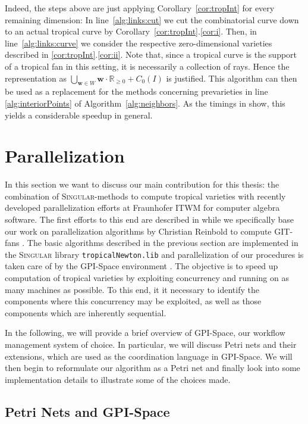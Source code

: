 \documentclass[
  paper=a4,
  titlepage,
  bibliography=totoc,
  pagesize=pdftex
]{scrartcl}
\numberwithin{figure}{section}
\numberwithin{equation}{section}
\numberwithin{table}{section}
\newcommand*\setR{\mathds{R}}
\let\vec\mathbf
\theoremstyle{definition}
\numberwithin{definition}{section}
\begin{document}
Indeed, the steps above are just applying Corollary~\ref{cor:tropInt} for every remaining
dimension: In line~\ref{alg:links:cut} we cut the combinatorial curve down to an actual
tropical curve by Corollary~\ref{cor:tropInt}.\ref{cor:i}. Then, in
line~\ref{alg:links:curve} we consider the respective zero-dimensional varieties described
in \ref{cor:tropInt}.\ref{cor:ii}. Note that, since a tropical curve is the support of a
tropical fan in this setting, it is necessarily a collection of rays. Hence the
representation as $\bigcup_{\vec w \in W} \vec w\cdot \setR_{\geq0} + C_0(I)$ is
justified. This algorithm can then be used as a replacement for the methods concerning
prevarieties in line \ref{alg:interiorPoints} of Algorithm~\ref{alg:neighbors}. As the
timings in \cite{tropPointsLinks} show, this yields a considerable speedup in general.

\section{Parallelization}

In this section we want to discuss our main contribution for this thesis: the combination
of \textsc{Singular}-methods to compute tropical varieties with recently developed
parallelization efforts at Fraunhofer ITWM for computer algebra software. The first
efforts to this end are described in \cite{towardsParallel} while we specifically base our
work on parallelization algorithms by Christian Reinbold to compute GIT-fans
\cite{reinboldGitFan}. The basic algorithms described in the previous section are
implemented in the \textsc{Singular} library \texttt{tropicalNewton.lib}
\cite{tropNewtLib} and parallelization of our procedures is taken care of by the GPI-Space
environment \cite{gpispace}. The objective is to speed up computation of tropical
varieties by exploiting concurrency and running on as many machines as possible. To this
end, it it necessary to identify the components where this concurrency may be exploited,
as well as those components which are inherently sequential.

In the following, we will provide a brief overview of GPI-Space, our workflow management
system of choice. In particular, we will discuss Petri nets and their extensions, which
are used as the coordination language in GPI-Space. We will then begin to reformulate our
algorithm as a Petri net and finally look into some implementation details to illustrate
some of the choices made.

\subsection{Petri Nets and GPI-Space}
\end{document}
